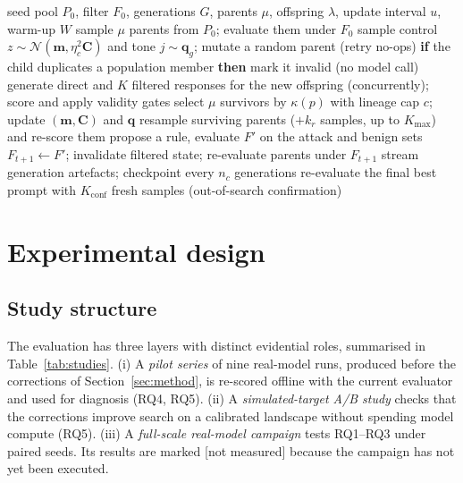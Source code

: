 \documentclass[preprint,12pt,authoryear]{elsarticle}
\newcommand{\nm}{[not measured]}
\begin{document}
\begin{algorithm}[t]
\caption{Coevolutionary prompt-injection search}
\label{alg:coevo}
\small
\begin{algorithmic}[1]
\Require seed pool $P_0$, filter $F_0$, generations $G$, parents $\mu$, offspring $\lambda$, update interval $u$, warm-up $W$
\State sample $\mu$ parents from $P_0$; evaluate them under $F_0$
    \State sample control $z\sim\mathcal N(\mathbf m,\eta_c^2\mathbf C)$ and tone $j\sim\mathbf q_g$; mutate a random parent (retry no-ops)
    \State \textbf{if} the child duplicates a population member \textbf{then} mark it invalid (no model call)
  \EndFor
  \State generate direct and $K$ filtered responses for the new offspring (concurrently); score and apply validity gates
  \State select $\mu$ survivors by $\kappa(p)$ with lineage cap $c$; update $(\mathbf m,\mathbf C)$ and $\mathbf q$
  \State resample surviving parents ($+k_r$ samples, up to $K_{\max}$) and re-score them
    \State propose a rule, evaluate $F'$ on the attack and benign sets
      \State $F_{t+1}\gets F'$; invalidate filtered state; re-evaluate parents under $F_{t+1}$
    \EndIf
  \EndIf
  \State stream generation artefacts; checkpoint every $n_c$ generations
\EndFor
\State re-evaluate the final best prompt with $K_{\mathrm{conf}}$ fresh samples (out-of-search confirmation)
\end{algorithmic}
\end{algorithm}

\section{Experimental design}
\label{sec:design}

\subsection{Study structure}
The evaluation has three layers with distinct evidential roles, summarised in Table~\ref{tab:studies}. (i) A \emph{pilot series} of nine real-model runs, produced before the corrections of Section~\ref{sec:method}, is re-scored offline with the current evaluator and used for diagnosis (RQ4, RQ5). (ii) A \emph{simulated-target A/B study} checks that the corrections improve search on a calibrated landscape without spending model compute (RQ5). (iii) A \emph{full-scale real-model campaign} tests RQ1--RQ3 under paired seeds. Its results are marked \nm{} because the campaign has not yet been executed.
\end{document}
